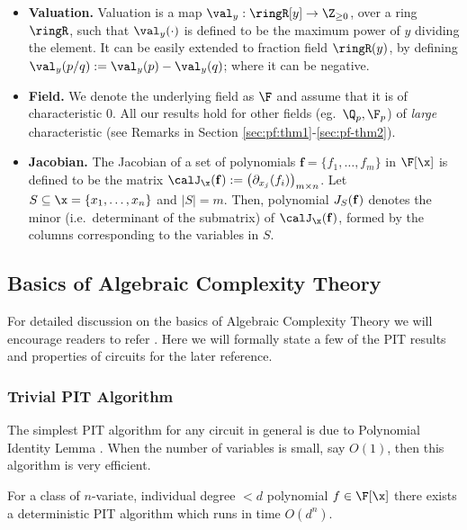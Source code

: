 \begin{itemize}
    \item \textbf{Valuation.} Valuation is a map $\val_y : \ringR[y] \to \Z_{\ge 0}$, over a ring $\ringR$, such that $\val_y(\cdot)$ is defined to be the maximum power of $y$ dividing the element. It can be easily extended to fraction field $\ringR(y)$, by defining $\val_{y}(p/q):= \val_y(p) - \val_{y}(q)$; where it can be negative.
    
    \item \textbf{Field.} We denote the underlying field as $\F$ and assume that it is of characteristic $0$. All our results hold for other fields (eg.~$\Q_p, \F_p$) of \emph{large} characteristic (see Remarks in Section \ref{sec:pf:thm1}-\ref{sec:pf-thm2}). 
    
    \item \textbf{Jacobian.} The Jacobian of a set of polynomials ${\mathbf f}=\{f_1,\hdots,f_m\}$ in $\F[\x]$ is defined to be the matrix $\calJ_{\x}({\mathbf f}) := \left(\partial_{x_j}(f_i)\right)_{m \times n}$. Let $S \subseteq \x = \{x_1,\hdots,x_n\}$ and $|S|=m$. Then, polynomial $J_{S}({\bf f})$ denotes the minor (i.e.~determinant
    of the submatrix) of $\calJ_{\x}({\bf f})$, formed by the columns corresponding to the variables in $S$.
\end{itemize}

\subsection{Basics of Algebraic Complexity Theory} \label{sec:basic-act}

For detailed discussion on the basics of Algebraic Complexity Theory we will encourage readers to refer \cite{shpilka2010arithmetic,saxena2009progress,Mah13,saxena2014progress,saptharishi2019survey}. Here we will formally state a few of the PIT results and properties of circuits for the later reference.

\subsubsection*{Trivial PIT Algorithm}

The simplest PIT algorithm for any circuit in general is due to Polynomial Identity Lemma \cite{ore1922hohere,DL78,Zip79,schwartz1980fast}. When the number of variables is small, say $O(1)$, then this algorithm is very efficient.

\begin{lemma} \label{lem:trivial-pit}
    For a class of $n$-variate, individual degree $ < d$ polynomial $f \in \F[\x]$ there exists a deterministic PIT algorithm which runs in time $O(d^n)$.
\end{lemma}

